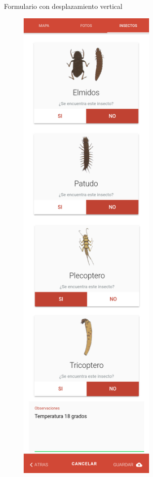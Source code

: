 \begin{itemize}
\begin{itemize}
\begin{figure}
									\label{fig:registroPaso3C}
							\end{figure}
							\caption{Formulario con desplazamiento vertical}
							\begin{figure}
								\centering
									\includegraphics[width=0.6\textwidth]{Screenshots/registroPaso3Completo.png}

\end{figure}
\end{itemize}
\end{itemize}
